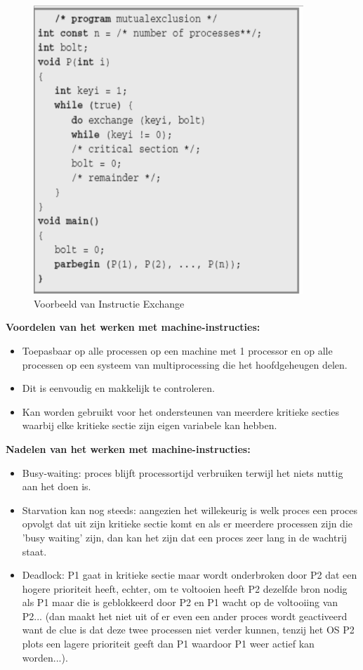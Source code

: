 \begin{figure}[htp]
    \centering
            \includegraphics[width=4in]{img/instructieexchange.png}
        \caption{Voorbeeld van Instructie Exchange}
    \label{fig:Voorbeeld van Instructie Exchange}
\end{figure}



\textbf{Voordelen van het werken met machine-instructies:}

\begin{itemize}
\item Toepasbaar op alle processen op een machine met 1 processor en op alle processen op een systeem van multiprocessing die het hoofdgeheugen delen.
\item Dit is eenvoudig en makkelijk te controleren.
\item Kan worden gebruikt voor het ondersteunen van meerdere kritieke secties waarbij elke kritieke sectie zijn eigen variabele kan hebben.
\end{itemize}

\textbf{Nadelen van het werken met machine-instructies:}

\begin{itemize}
\item Busy-waiting: proces blijft processortijd verbruiken terwijl het niets nuttig aan het doen is.
\item Starvation kan nog steeds: aangezien het willekeurig is welk proces een proces opvolgt dat uit zijn kritieke sectie komt en als er meerdere processen zijn die 'busy waiting' zijn, dan kan het zijn dat een proces zeer lang in de wachtrij staat.
\item Deadlock: P1 gaat in kritieke sectie maar wordt onderbroken door P2 dat een hogere prioriteit heeft, echter, om te voltooien heeft P2 dezelfde bron nodig als P1 maar die is geblokkeerd door P2 en P1 wacht op de voltooiing van P2... (dan maakt het niet uit of er even een ander proces wordt geactiveerd want de clue is dat deze twee processen niet verder kunnen, tenzij het OS P2 plots een lagere prioriteit geeft dan P1 waardoor P1 weer actief kan worden...).
\end{itemize}
